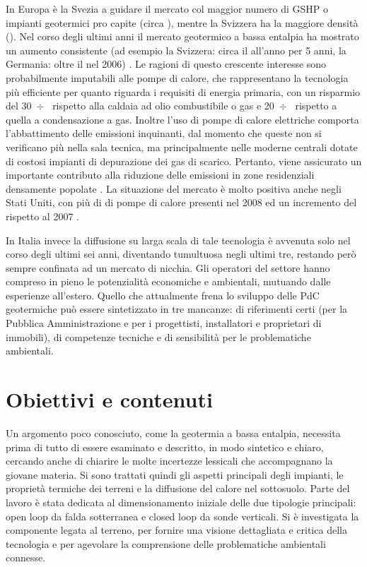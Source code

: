 In Europa è la Svezia a guidare il mercato col maggior numero di GSHP o impianti geotermici pro capite (circa ), mentre la Svizzera ha la maggiore densità (). Nel corso degli ultimi anni il mercato geotermico a bassa \gls{entalpia} ha mostrato un aumento consistente (ad esempio la Svizzera: circa il  all'anno per 5 anni, la Germania: oltre il  nel 2006) \citep{sanner}. Le ragioni di questo crescente interesse sono probabilmente imputabili alle pompe di calore, che rappresentano la tecnologia più efficiente per quanto riguarda i requisiti di energia primaria, con un risparmio del 30~$\div$~ rispetto alla caldaia ad olio combustibile o gas e 20~$\div$~ rispetto a quella a condensazione a gas. Inoltre l'uso di pompe di calore elettriche comporta l'abbattimento delle emissioni inquinanti, dal momento che queste non si verificano più nella sala tecnica, ma principalmente nelle moderne centrali dotate di costosi impianti di depurazione dei gas di scarico. Pertanto, viene assicurato un importante contributo alla riduzione delle emissioni in zone residenziali densamente popolate \citep{vdi_blatt1}. La situazione del mercato è molto positiva anche negli Stati Uniti, con più di  di pompe di calore presenti nel 2008 ed un incremento del  rispetto al 2007 \citep{marketusa}.

In Italia invece la diffusione su larga scala di tale tecnologia è avvenuta solo nel corso degli ultimi sei anni, diventando tumultuosa negli ultimi tre, restando però sempre confinata ad un mercato di nicchia. Gli operatori del settore hanno compreso in pieno le potenzialità economiche e ambientali, mutuando dalle esperienze all'estero. Quello che attualmente frena lo sviluppo delle PdC geotermiche può essere sintetizzato in tre mancanze: di riferimenti certi (per la Pubblica Amministrazione e per i progettisti, installatori e proprietari di immobili), di competenze tecniche e di sensibilità per le problematiche ambientali.

\section*{Obiettivi e contenuti}
Un argomento poco conosciuto, come la geotermia a bassa \gls{entalpia}, necessita prima di tutto di essere esaminato e descritto, in modo sintetico e chiaro, cercando anche di chiarire le molte incertezze lessicali che accompagnano la giovane materia. Si sono trattati quindi gli aspetti principali degli impianti, le proprietà termiche dei terreni e la diffusione del calore nel sottosuolo. Parte del lavoro è stata dedicata al dimensionamento iniziale delle due tipologie principali: open loop da falda sotterranea e closed loop da sonde verticali. Si è investigata la componente legata al terreno, per fornire una visione dettagliata e critica della tecnologia e per agevolare la comprensione delle problematiche ambientali connesse.


